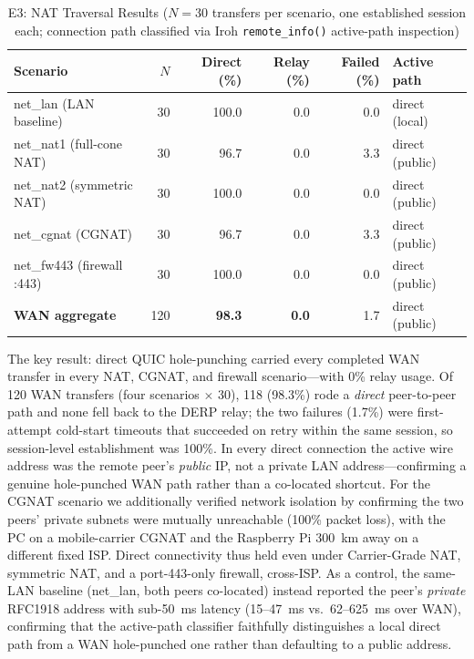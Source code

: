 \documentclass[a4paper,fleqn]{cas-dc}
\begin{document}
\begin{table}[t]
\centering
\caption{E3: NAT Traversal Results ($N{=}30$ transfers per scenario, one established session each; connection path classified via Iroh \texttt{remote\_info()} active-path inspection)}
\label{tab:e3}
\footnotesize
\begin{tabular}{l r r r r l}
\toprule
\textbf{Scenario} & \textbf{$N$} & \textbf{Direct (\%)} & \textbf{Relay (\%)} & \textbf{Failed (\%)} & \textbf{Active path} \\
\midrule
net\_lan   (LAN baseline)   & 30 & 100.0 & 0.0 & 0.0 & direct (local)  \\
net\_nat1  (full-cone NAT)  & 30 & 96.7  & 0.0 & 3.3 & direct (public) \\
net\_nat2  (symmetric NAT)  & 30 & 100.0 & 0.0 & 0.0 & direct (public) \\
net\_cgnat (CGNAT)          & 30 & 96.7  & 0.0 & 3.3 & direct (public) \\
net\_fw443 (firewall :443)  & 30 & 100.0 & 0.0 & 0.0 & direct (public) \\
\midrule
\textbf{WAN aggregate}      & 120 & \textbf{98.3} & \textbf{0.0} & 1.7 & direct (public) \\
\bottomrule
\end{tabular}
\end{table}

The key result: direct QUIC hole-punching carried every completed WAN transfer in every NAT, CGNAT, and firewall scenario---with 0\% relay usage. Of 120 WAN transfers (four scenarios $\times$ 30), 118 (98.3\%) rode a \emph{direct} peer-to-peer path and none fell back to the DERP relay; the two failures (1.7\%) were first-attempt cold-start timeouts that succeeded on retry within the same session, so session-level establishment was 100\%. In every direct connection the active wire address was the remote peer's \emph{public} IP, not a private LAN address---confirming a genuine hole-punched WAN path rather than a co-located shortcut. For the CGNAT scenario we additionally verified network isolation by confirming the two peers' private subnets were mutually unreachable (100\% packet loss), with the PC on a mobile-carrier CGNAT and the Raspberry Pi 300~km away on a different fixed ISP. Direct connectivity thus held even under Carrier-Grade NAT, symmetric NAT, and a port-443-only firewall, cross-ISP. As a control, the same-LAN baseline (net\_lan, both peers co-located) instead reported the peer's \emph{private} RFC1918 address with sub-50~ms latency (15--47~ms vs.~62--625~ms over WAN), confirming that the active-path classifier faithfully distinguishes a local direct path from a WAN hole-punched one rather than defaulting to a public address.
\end{document}
